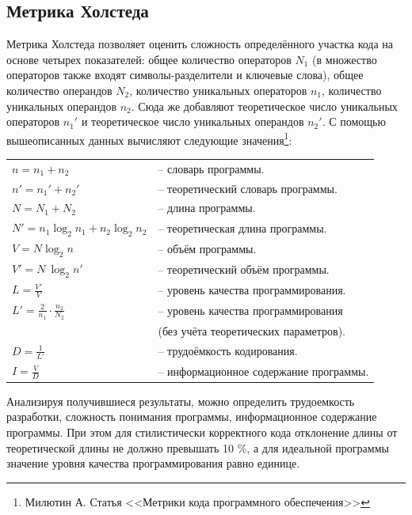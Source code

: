\subsection{Метрика Холстеда}
Метрика Холстеда позволяет оценить сложность определённого участка кода на основе 
четырех показателей: общее количество операторов $N_1$ (в множество операторов также входят символы-разделители и ключевые слова), общее количество операндов $N_2$, количество уникальных операторов $n_1$, количество уникальных операндов $n_2$. Сюда же добавляют теоретическое число уникальных операторов $n_1'$ и теоретическое число уникальных операндов $n_2'$. С помощью вышеописанных данных вычисляют следующие значения\footnote{Милютин А. Статья <<Метрики кода программного обеспечения>>}:
\begin{center}
\begin{tabular}{|l l|}
\hline
$n = n_1 + n_2$ &-- словарь программы.
\\
$n' = n_1' + n_2'$ &-- теоретический словарь программы.
\\
$N = N_1 + N_2$ &-- длина программы.
\\
$N' = n_1 \log_{2} n_1 + n_2 \log_{2} n_2$ &-- теоретическая длина программы.
\\
$V = N\log_2 n$ &-- объём программы.
\\
$V'= N\ \log_2 n'$ &-- теоретический объём программы.
\\
$L = \frac{V'}{V}$ &-- уровень качества программирования.
\\
$L' =\frac{2}{n_1} \cdot \frac{n_2}{N_2}$ &-- уровень качества программирования 
\\ & (без учёта теоретических параметров). 
\\
$D = \frac{1}{L'}$ &-- трудоёмкость кодирования.
\\
$I = \frac{V}{D}$ &-- информационное содержание программы.
\\\hline
\end{tabular}
\end{center}
Анализируя получившиеся результаты, можно определить трудоемкость разработки, сложность понимания программы, информационное содержание программы. При этом
для стилистически корректного кода отклонение длины от теоретической длины не должно превышать 10 \%, а для идеальной программы значение уровня качества программирования равно единице.  
